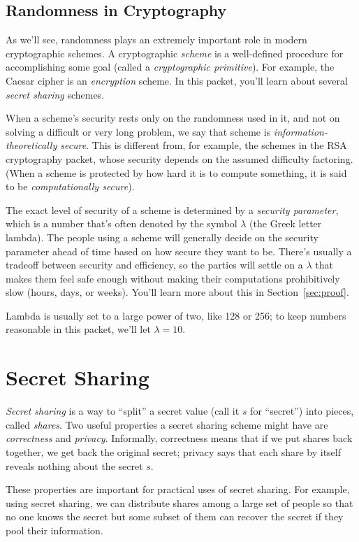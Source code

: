 \documentclass[12 pt]{article}
\newcounter{example}[section]
\begin{document}
\subsection{Randomness in Cryptography}

As we'll see, randomness plays an extremely important role in modern cryptographic
schemes. A cryptographic \emph{scheme} is a well-defined procedure for accomplishing 
some goal (called a \emph{cryptographic primitive}). For example, the Caesar 
cipher is an \emph{encryption} scheme. 
In this packet, you'll learn about several \emph{secret sharing} schemes. 

When a scheme's security rests only on the randomness used in it, and not on 
solving a difficult or very long problem, we say that scheme is
\emph{information-theoretically secure}. This is different from, for example,
the schemes in the RSA cryptography packet, whose security depends on 
the assumed difficulty factoring. (When a scheme is protected by how hard it is 
to compute something, it is said to be \emph{computationally secure}).

The exact level of security of a scheme is determined by a \emph{security 
parameter}, which is a number that's often denoted by the symbol $\lambda$ 
(the Greek letter lambda). The people using a scheme will generally decide 
on the security parameter ahead of time based on how secure they want to 
be. There's usually a tradeoff between security and efficiency, so the 
parties will settle on a $\lambda$ that makes them feel safe enough without 
making their computations prohibitively slow (hours, days, or weeks).
You'll learn more about this in Section~\ref{sec:proof}.

Lambda is usually set to a large power of two, like 128 or 256; to keep 
numbers reasonable in this packet, we'll let $\lambda=10$.

\newpage
\section{Secret Sharing}\label{sec:ss}
\emph{Secret sharing} is a way to ``split'' a secret value (call it $s$ for 
``secret'') into pieces, called \emph{shares}. 
Two useful properties a secret sharing scheme might have are \emph{correctness} and 
\emph{privacy}. Informally, correctness means that if we put shares back together, 
we get back the original secret; privacy says that each share by itself reveals 
nothing about the secret $s$. 

These properties are important for practical uses of secret sharing. For 
example, using secret sharing, we can distribute shares among a large set of people so that no one 
knows the secret but some subset of them can recover the secret if they 
pool their information.
\end{document}
